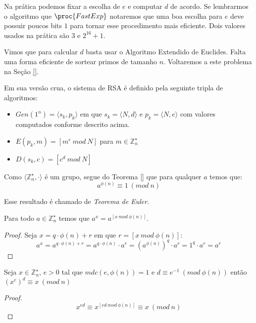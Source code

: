 Na prática podemos fixar a escolha de $e$ e computar $d$ de acordo.
Se lembrarmos o algoritmo que $\proc{FastExp}$ notaremos que uma boa escolha para $e$ deve possuir poucos bits $1$ para tornar esse procedimento mais eficiente.
Dois valores usados na prática são $3$ e $2^{16}+1$.

Vimos que para calcular $d$ basta usar o Algoritmo Extendido de Euclides.
Falta uma forma eficiente de sortear primos de tamanho $n$.
Voltaremos a este problema na Seção \ref{}.

Em sua versão crua, o sistema de RSA é definido pela seguinte tripla de algoritmos:

\begin{itemize}
\item $Gen(1^n) = \langle s_k, p_k \rangle$ em que $s_k = \langle N, d \rangle$ e $p_k = \langle N, e \rangle$ com valores computados conforme descrito acima. 
\item $E(p_k, m) = [m^e\ mod\ N]$ para $m \in \mathbb{Z}_n^\star$
\item $D(s_k, c) = [c^d\ mod\ N]$
\end{itemize}

Como $\langle \mathbb{Z}_n^\star, \cdot \rangle$ é um grupo, segue do Teorema \ref{} que para qualquer $a$ temos que:
\begin{displaymath}
  a^{\phi(n)} \equiv 1\ (mod\ n)
\end{displaymath}

Esse resultado é chamado de {\em Teorema de Euler}.

\begin{corollary}
  Para todo $a \in \mathbb{Z}_n^\star$ temos que $a^x = a^{[x\ mod\ \phi(n)]}$.
\end{corollary}
\begin{proof}
  Seja $x = q \cdot \phi(n) + r$ em que $r = [x\ mod\ \phi(n)]$:
  \begin{displaymath}
    a^x = a^{q \cdot \phi(n) + r} = a^{q \cdot \phi(n)} \cdot a^r = (a^{\phi(n)})^q \cdot a^r = 1^q \cdot a^r = a^r
  \end{displaymath}
\end{proof}


\begin{corollary}
Seja $x \in \mathbb{Z}_n^\star$, $e > 0$ tal que $mdc(e, \phi(n)) = 1$ e $d \equiv e^{-1}\ (mod\ \phi(n))$ então $(x^e)^d \equiv x\ (mod\ n)$
\end{corollary}

\begin{proof}
  \begin{displaymath}
    x^{ed} \equiv x^{[ed\ mod\ \phi(n)]} \equiv x\ (mod\ n)
  \end{displaymath}
\end{proof}


